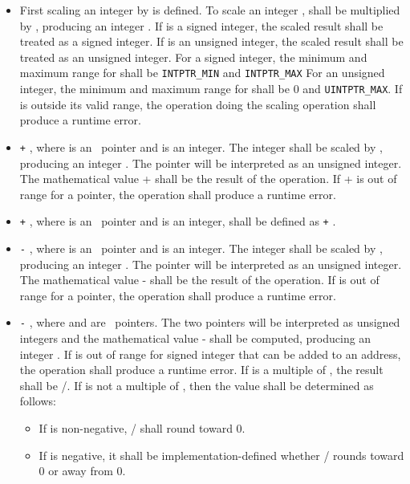 \begin{itemize}
\item
  First scaling an integer by  is
  defined. To scale an integer ,  shall be multiplied by
  , producing an integer . If
   is a signed integer, the scaled result shall be treated as a
  signed integer. If  is an unsigned integer, the scaled result
  shall be treated as an unsigned integer. For a signed integer, the
  minimum and maximum range for  shall be \texttt{INTPTR\_MIN} and
  \texttt{INTPTR\_MAX} For an unsigned integer, the minimum and maximum
  range for  shall be 0 and \texttt{UINTPTR\_MAX}. If  is
  outside its valid range, the operation doing the scaling operation
  shall produce a runtime error.
\item
   \texttt{+} , where  is an
  \arrayptrT\ pointer
  and  is an integer. The integer  shall be scaled by
  , producing an integer . The
  pointer  will be interpreted as an unsigned integer. The mathematical
  value  +  shall be the result of the operation. If
   +  is out of range for a pointer, the operation shall
  produce a runtime error.
\item
   \texttt{+} , where  is an
  \arrayptrT\ pointer
  and  is an integer, shall be defined as  \texttt{+}
  .
\item
   \texttt{-} , where  is an
  \arrayptrT\ pointer
  and  is an integer. The integer  shall be scaled by
  , producing an integer . The
  pointer  will be interpreted as an unsigned integer. The
  mathematical value  -  shall be the result of the
  operation. If   is out of range for a pointer, the
  operation shall produce a runtime error.
\item
   \texttt{-} , where  and  are
  \arrayptrT\
  pointers. The two pointers will be interpreted as unsigned integers
  and the mathematical value \var{p} - \var{q} shall be computed,
  producing an integer . If  is out of range for signed
  integer that can be added to an address, the operation shall produce a
  runtime error. If  is a multiple of
  , the result shall be
  /. If \var{j} is not a
  multiple of \sizeof{\var{T}}, then the value shall
  be determined as follows:

  \begin{itemize}
  \item
    If  is non-negative,
    \var{j}/ shall round toward 0.
  \item
    If  is negative, it shall be implementation-defined whether
    \var{j}/\sizeof{\var{T}} rounds toward 0 or away
    from 0.
  \end{itemize}
\end{itemize}

